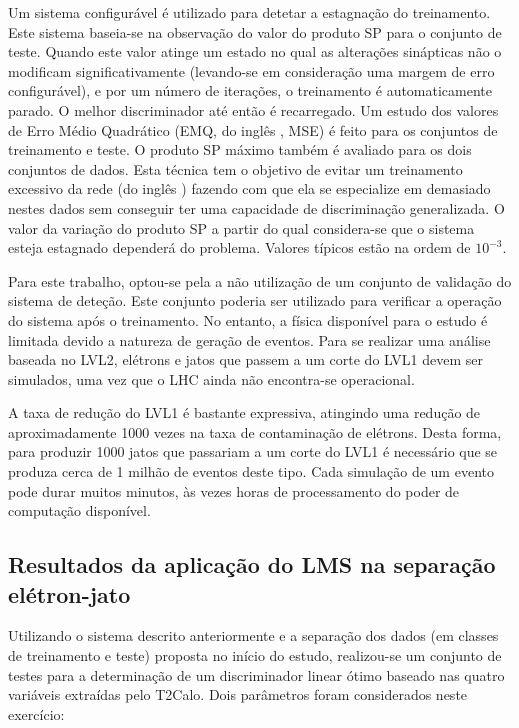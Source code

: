 Um sistema configurável é utilizado para detetar a estagnação do
treinamento. Este sistema baseia-se na observação do valor do produto SP para
o conjunto de teste. Quando este valor atinge um estado no qual as alterações
sinápticas não o modificam significativamente (levando-se em consideração uma
margem de erro configurável), e por um número de iterações, o treinamento é
automaticamente parado. O melhor discriminador até então é recarregado. Um
estudo dos valores de Erro Médio Quadrático (EMQ, do inglês , MSE) é feito para os conjuntos de treinamento e teste. O produto SP
máximo também é avaliado para os dois conjuntos de dados. Esta técnica tem o
objetivo de evitar um treinamento excessivo da rede (do inglês
) fazendo com que ela se especialize em demasiado nestes
dados sem conseguir ter uma capacidade de discriminação generalizada. O valor
da variação do produto SP a partir do qual considera-se que o sistema esteja
estagnado dependerá do problema. Valores típicos estão na ordem de $10^{-3}$.

Para este trabalho, optou-se pela a não utilização de um conjunto de validação
do sistema de deteção. Este conjunto poderia ser utilizado para verificar a
operação do sistema após o treinamento. No entanto, a física disponível para o
estudo é limitada devido a natureza de geração de eventos. Para se realizar
uma análise baseada no LVL2, elétrons e jatos que passem a um corte do LVL1
devem ser simulados, uma vez que o LHC ainda não encontra-se operacional. 

A taxa de redução do LVL1 é bastante expressiva, atingindo uma redução de
aproximadamente 1000 vezes na taxa de contaminação de elétrons. Desta forma,
para produzir 1000 jatos que passariam a um corte do LVL1 é necessário que se
produza cerca de 1 milhão de eventos deste tipo. Cada simulação de um evento
pode durar muitos minutos, às vezes horas de processamento do poder de
computação disponível.


\subsection{Resultados da aplicação do LMS na separação e\-lé\-tron-jato}

Utilizando o sistema descrito anteriormente e a separação dos dados (em
classes de treinamento e teste) proposta no início do estudo, realizou-se um
conjunto de testes para a determinação de um discriminador linear ótimo
baseado nas quatro variáveis extraídas pelo T2Calo. Dois parâmetros foram
considerados neste exercício:

